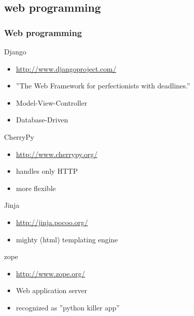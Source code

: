 \documentclass{beamer}
\begin{document}
\subsection*{web programming}
\begin{frame}[allowframebreaks]
	\frametitle{Web programming}
	\begin{block}{Django}
	\begin{itemize}
		\item \url{http://www.djangoproject.com/}
		\item ''The Web Framework for perfectionists with deadlines.''
		\item Model-View-Controller
		\item Database-Driven
	\end{itemize}
	\end{block}
	
	\begin{block}{CherryPy}
	\begin{itemize}
		\item \url{http://www.cherrypy.org/}
		\item handles only HTTP
		\item more flexible
	\end{itemize}
	\end{block}
\framebreak
	\begin{block}{Jinja}
	\begin{itemize}
		\item \url{http://jinja.pocoo.org/}
		\item mighty (html) templating engine
	\end{itemize}
	\end{block}
	
	\begin{block}{zope}
	\begin{itemize}
		\item \url{http://www.zope.org/}
		\item Web application server
		\item recognized as ''python killer app'' 
	\end{itemize}
	\end{block}
\end{frame}
\end{document}
